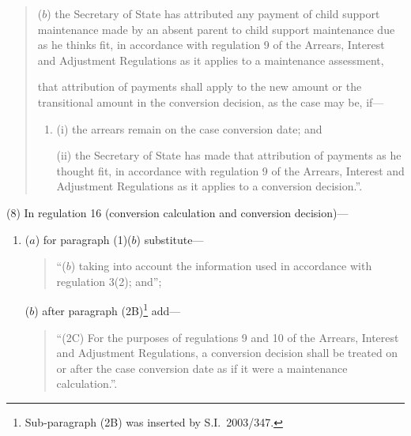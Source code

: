\documentclass[12pt,a4paper]{article}
\begin{document}
\begin{quotation}
\begin{enumerate}
($b$) the Secretary of State has attributed any payment of child support maintenance made by an absent parent to child support maintenance due as he thinks fit, in accordance with regulation 9 of the Arrears, Interest and Adjustment Regulations as it applies to a maintenance assessment,
\end{enumerate}
that attribution of payments shall apply to the new amount or the transitional amount in the conversion decision, as the case may be, if—
\begin{enumerate}\item[]
(i) the arrears remain on the case conversion date; and

(ii) the Secretary of State has made that attribution of payments as he thought fit, in accordance with regulation 9 of the Arrears, Interest and Adjustment Regulations as it applies to a conversion decision.”.
\end{enumerate}
\end{quotation}

(8) In regulation 16 (conversion calculation and conversion decision)—
\begin{enumerate}\item[]
($a$) for paragraph (1)($b$)  substitute—
\begin{quotation}
“($b$) taking into account the information used in accordance with regulation 3(2); and”;
\end{quotation}

($b$) after paragraph (2B)\footnote{Sub-paragraph (2B) was inserted by S.I.\ 2003/347.} add—
\begin{quotation}
“(2C) For the purposes of regulations 9 and 10 of the Arrears, Interest and Adjustment Regulations, a conversion decision shall be treated on or after the case conversion date as if it were a maintenance calculation.”.
\end{quotation}
\end{enumerate}
\end{document}
